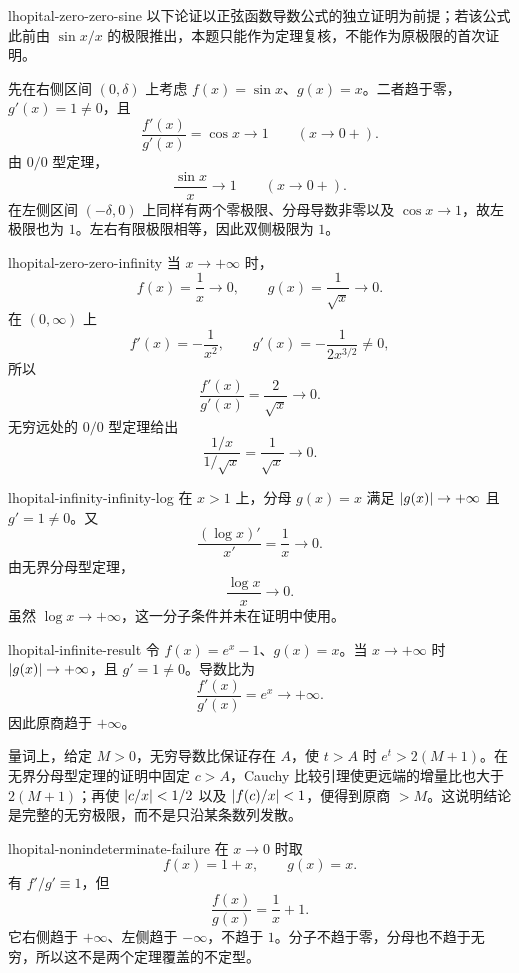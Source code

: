 \begin{solution}{lhopital-zero-zero-sine}
以下论证以正弦函数导数公式的独立证明为前提；若该公式此前由 \(\sin x/x\) 的极限推出，本题只能作为定理复核，不能作为原极限的首次证明。

先在右侧区间 \((0,\delta)\) 上考虑 \(f(x)=\sin x\)、\(g(x)=x\)。二者趋于零，\(g'(x)=1\ne0\)，且
\[
 \frac{f'(x)}{g'(x)}=\cos x\longrightarrow1
 \qquad(x\to0+).
\]
由 \(0/0\) 型定理，
\[
 \frac{\sin x}{x}\longrightarrow1
 \qquad(x\to0+).
\]
在左侧区间 \((-\delta,0)\) 上同样有两个零极限、分母导数非零以及 \(\cos x\to1\)，故左极限也为 \(1\)。左右有限极限相等，因此双侧极限为 \(1\)。
\end{solution}

\begin{solution}{lhopital-zero-zero-infinity}
当 \(x\to+\infty\) 时，
\[
 f(x)=\frac1x\to0,\qquad
 g(x)=\frac1{\sqrt x}\to0.
\]
在 \((0,\infty)\) 上
\[
 f'(x)=-\frac1{x^2},\qquad
 g'(x)=-\frac1{2x^{3/2}}\ne0,
\]
所以
\[
 \frac{f'(x)}{g'(x)}
 =\frac{2}{\sqrt x}\longrightarrow0.
\]
无穷远处的 \(0/0\) 型定理给出
\[
 \frac{1/x}{1/\sqrt x}=\frac1{\sqrt x}\longrightarrow0.
\]
\end{solution}

\begin{solution}{lhopital-infinity-infinity-log}
在 \(x>1\) 上，分母 \(g(x)=x\) 满足 \(\left|g(x)\right|\to+\infty\) 且 \(g'=1\ne0\)。又
\[
 \frac{(\log x)'}{x'}=\frac1x\longrightarrow0.
\]
由无界分母型定理，
\[
 \frac{\log x}{x}\longrightarrow0.
\]
虽然 \(\log x\to+\infty\)，这一分子条件并未在证明中使用。
\end{solution}

\begin{solution}{lhopital-infinite-result}
令 \(f(x)=e^x-1\)、\(g(x)=x\)。当 \(x\to+\infty\) 时 \(\left|g(x)\right|\to+\infty\)，且 \(g'=1\ne0\)。导数比为
\[
 \frac{f'(x)}{g'(x)}=e^x\longrightarrow+\infty.
\]
因此原商趋于 \(+\infty\)。

量词上，给定 \(M>0\)，无穷导数比保证存在 \(A\)，使 \(t>A\) 时 \(e^t>2(M+1)\)。在无界分母型定理的证明中固定 \(c>A\)，Cauchy 比较引理使更远端的增量比也大于 \(2(M+1)\)；再使 \(\left|c/x\right|<1/2\) 以及 \(\left|f(c)/x\right|<1\)，便得到原商 \(>M\)。这说明结论是完整的无穷极限，而不是只沿某条数列发散。
\end{solution}

\begin{solution}{lhopital-nonindeterminate-failure}
在 \(x\to0\) 时取
\[
 f(x)=1+x,\qquad g(x)=x.
\]
有 \(f'/g'\equiv1\)，但
\[
 \frac{f(x)}{g(x)}=\frac1x+1.
\]
它右侧趋于 \(+\infty\)、左侧趋于 \(-\infty\)，不趋于 \(1\)。分子不趋于零，分母也不趋于无穷，所以这不是两个定理覆盖的不定型。
\end{solution}

